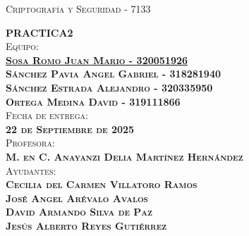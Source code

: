 \begin{titlepage}
\begin{minipage}[c][0.81\textheight][t]{0.75\textwidth}
\begin{center}
			{\large\scshape Criptografía y Seguridad - 7133}\\[.2in]
			
			\vspace{2cm}            
			
			\textsc{\LARGE \textbf{P}\hspace{1cm}\textbf{R}\hspace{1cm}\textbf{A}\hspace{1cm}\textbf{C}\hspace{1cm}\textbf{T}\hspace{1cm}\textbf{I}\hspace{1cm}\textbf{C}\hspace{1cm}\textbf{A}\hspace{1.3cm}\textbf{2}}\\[2cm]
			\textsc{\Large{Equipo:}\normalsize \\
                \vspace{.3cm}
				\textbf{\href{https://github.com/JuanSosaCiencias}{{Sosa Romo Juan Mario - 320051926}} \\
                \vspace{.2cm}
				Sánchez Pavia Angel Gabriel - 318281940 \\
                \vspace{.2cm}
                Sánchez Estrada Alejandro - 320335950 \\
                \vspace{.2cm}
                Ortega Medina David - 319111866}}\\[0.5cm]     
			
			\textsc{{Fecha de entrega: \\ \textbf{22 de Septiembre de 2025}}}\\[0.5cm]        
			
			\textsc{{Profesora: \\ \textbf{M. en C. Anayanzi Delia Martínez Hernández}}}\\[0.5cm]  
			
			\textsc{Ayudantes: \\ \textbf{Cecilia del Carmen Villatoro Ramos \\ José Angel Arévalo Avalos \\ David Armando Silva de Paz \\ Jesús Alberto Reyes Gutiérrez
			} }
			
			
			\vspace{0.5cm}
		\end{center}
	\end{minipage}
\end{titlepage}
